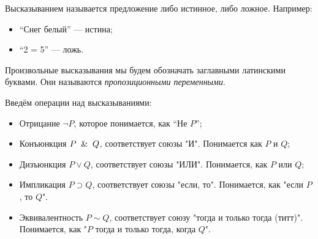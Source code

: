 \begin{definition}
	Высказыванием называется предложение либо истинное, либо ложное. Например:
	\begin{itemize}
		\item ``Снег белый'' --- истина;
		\item ``2  = 5'' --- ложь.
	\end{itemize}

	Произвольные высказывания мы будем обозначать заглавными латинскими
	буквами. Они называются \emph{пропозиционными
		переменными}.
\end{definition}

Введём операции над высказываниями:
\begin{itemize}
	\item Отрицание $\neg P$, которое понимается, как ``Не $P$'';
	\item Конъюнкция $P \And Q$, соответствует союзы "И". Понимается
	      как $P$ и $Q$;
	\item  Дизъюнкция $P \vee Q$, соответствует союзы "ИЛИ".
	      Понимается, как $P$ или $Q$;
	\item Импликация $P \supset Q$, соответствует союзы "если, то".
	      Понимается, как "если $P$, то $Q$".
	\item Эквивалентность $P \sim Q$, соответствует союзу "тогда и
	      только тогда (титт)". Понимается, как "$P$ тогда и только тогда,
	      когда $Q$".
\end{itemize}
